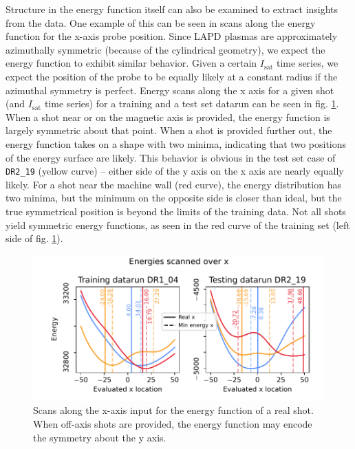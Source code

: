 Structure in the energy function itself can also be examined to extract insights from the data. One example of this can be seen in scans along the energy function for the x-axis probe position. Since LAPD plasmas are approximately azimuthally symmetric (because of the cylindrical geometry), we expect the energy function to exhibit similar behavior. Given a certain $I_\text{sat}$ time series, we expect the position of the probe to be equally likely at a constant radius if the azimuthal symmetry is perfect. Energy scans along the x axis for a given shot (and $I_\text{sat}$ time series) for a training and a test set datarun can be seen in fig. \ref{fig:energy_x_scan}. When a shot near or on the magnetic axis is provided, the energy function is largely symmetric about that point. When a shot is provided further out, the energy function takes on a shape with two minima, indicating that two positions of the energy surface are likely. This behavior is obvious in the test set case of \texttt{DR2\_19} (yellow curve) -- either side of the y axis on the x axis are nearly equally likely. For a shot near the machine wall (red curve), the energy distribution has two minima, but the minimum on the opposite side is closer than ideal, but the true symmetrical position is beyond the limits of the training data. Not all shots yield symmetric energy functions, as seen in the red curve of the training set (left side of fig. \ref{fig:energy_x_scan}). 

\begin{figure}
	\centering
	\includegraphics[width=400pt]{figures/energy_x_scan_train-test_39-0}
	\caption[Energy function scan along probe x coordinate]{\label{fig:energy_x_scan}Scans along the x-axis input for the energy function of a real shot. When off-axis shots are provided, the energy function may encode the symmetry about the y axis.}
\end{figure}

